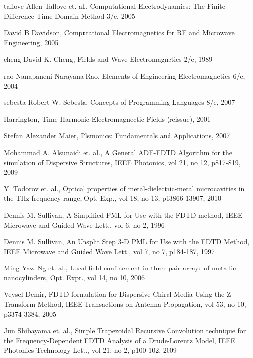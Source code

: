\cleardoublepage
{}
\begin{thebibliography}{999}
  \bibitem
  {taflove}
  Allen Taflove et. al., Computational Electrodynamics: The Finite-Difference Time-Domain Method 3/e, 2005
 
  \bibitem
  {}
  David B Davidson, Computational Electromagnetics for RF and Microwave Engineering, 2005

  \bibitem
  {cheng}
  David K. Cheng, Fields and Wave Electromagnetics 2/e, 1989

  \bibitem
  {rao} 
  Nanapaneni Narayana Rao, Elements of Engineering Electromagnetics 6/e, 2004

  \bibitem
  {sebesta}
  Robert W. Sebesta, Concepts of Programming Languages 8/e, 2007

  \bibitem
  {}
  Harrington, Time-Harmonic Electromagnectic Fields (reissue), 2001

  \bibitem
  {}
  Stefan Alexander Maier, Plsmonics: Fundamentals and Applications, 2007

  \bibitem
  {}
  Mohammad A. Alsunaidi et. al., A General ADE-FDTD Algorithm for the simulation of Dispersive Structures, IEEE Photonics, vol 21, no 12, p817-819, 2009

  \bibitem
  {}
  Y. Todorov et. al., Optical properties of metal-dielectric-metal microcavities in the THz frequency range, Opt. Exp., vol 18, no 13, p13866-13907, 2010

  \bibitem
  {}
  Dennis M. Sullivan, A Simplified PML for Use with the FDTD method, IEEE Microwave and Guided Wave Lett., vol 6, no 2, 1996

  \bibitem
  {}
  Dennis M. Sullivan, An Unsplit Step 3-D PML for Use with the FDTD Method, IEEE Microwave and Guided Wave Lett., vol 7, no 7, p184-187, 1997

  \bibitem
  {}
  Ming-Yaw Ng et. al., Local-field confinement in three-pair arrays of metallic nanocylinders, Opt. Expr., vol 14, no 10, 2006

  \bibitem
  {}
  Veysel Demir, FDTD formulation for Dispersive Chiral Media Using the Z Transform Method, IEEE Transactions on Antenna Propagation, vol 53, no 10, p3374-3384, 2005

  \bibitem
  {}  
  Jun Shibayama et. al., Simple Trapezoidal Recursive Convolution technique for the Frequency-Dependent FDTD Analysis of a Drude-Lorentz Model, IEEE Photonics Technology Lett., vol 21, no 2, p100-102, 2009
  
  

\end{thebibliography}
